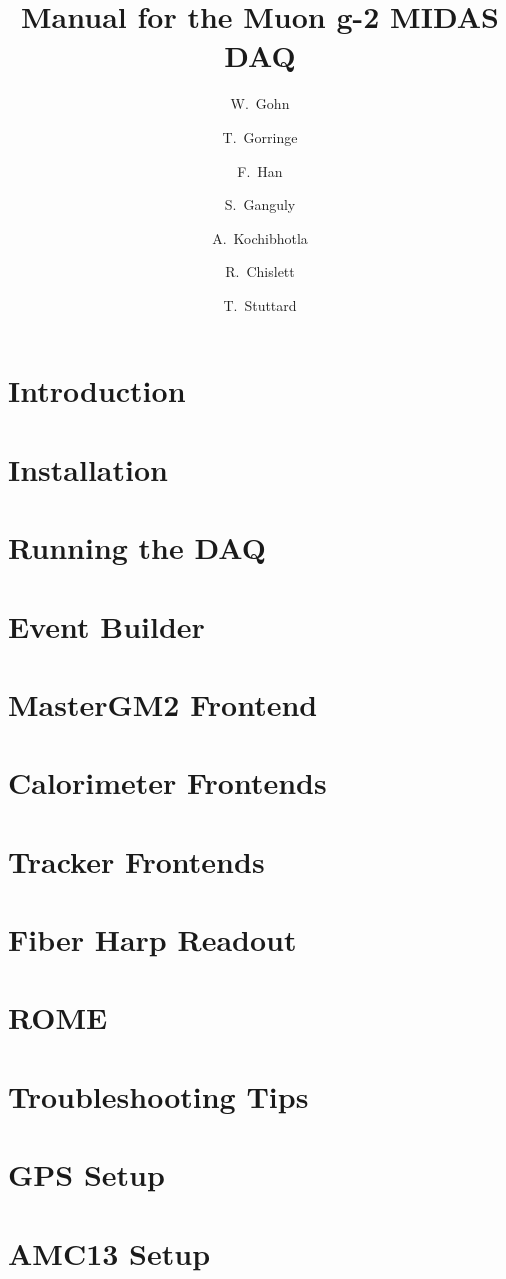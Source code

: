 \documentclass[11pt]{article}
\title{Manual for the Muon g-2 MIDAS DAQ}
\author{W.~Gohn}
\author{T.~Gorringe}
\author{F.~Han}
\affil{University of Kentucky}
\author{S.~Ganguly}
\author{A.~Kochibhotla}
\affil{University of Illinois}
\author{R.~Chislett}
\author{T.~Stuttard}
\affil{University College London}
\begin{document}
\maketitle

\tableofcontents

\newpage

\section{Introduction}

\section{Installation}



\section{Running the DAQ}



\section{Event Builder}



\section{MasterGM2 Frontend}



\section{Calorimeter Frontends}



\section{Tracker Frontends}



\section{Fiber Harp Readout}



\section{ROME}



\section{Troubleshooting Tips}



\appendix

\section{GPS Setup}



\section{AMC13 Setup}


\end{document}
